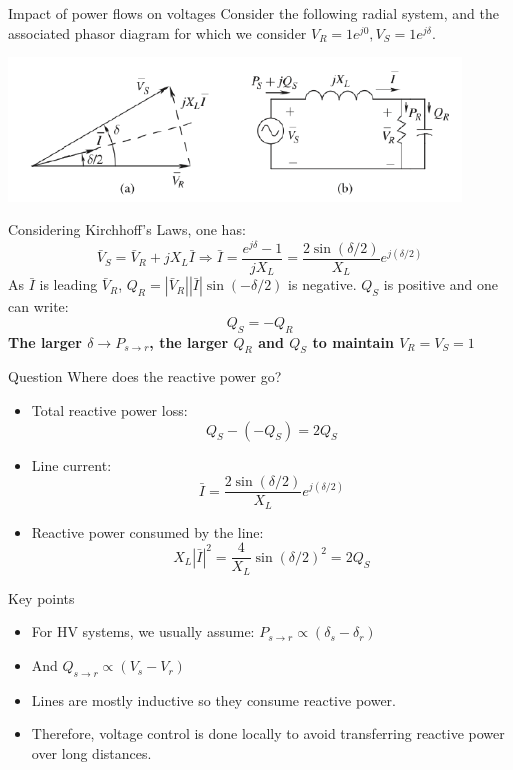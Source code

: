 \begin{frame}[allowframebreaks]{Impact of power flows on voltages}
Consider the following radial system, and the associated phasor diagram for which we consider $V_R = 1 e^{j0}, V_S = 1 e^{j\delta}$.
\begin{center}
\includegraphics[width=0.9\textwidth]{images/RadialSystem2.png}
\end{center}
Considering Kirchhoff's Laws, one has:
$$\bar{V}_S = \bar{V}_R + j X_L \bar{I} \Rightarrow \bar{I} = \frac{e^{j \delta}-1}{j X_L} = \frac{2 \sin(\delta/2)}{X_L} e^{j(\delta/2)}$$
As $\bar{I}$ is leading $\bar{V}_R$, $Q_R = |\bar{V}_R| |\bar{I}| \sin(-\delta/2)$ is negative. $Q_S$ is positive and one can write:
$$Q_S = -Q_R$$
\textbf{The larger $\delta \rightarrow P_{s \rightarrow r}$, the larger $Q_R$ and $Q_S$ to maintain $V_R = V_S = 1$}

\begin{block}{Question}
Where does the reactive power go?
\end{block}

\begin{itemize}
    \item Total reactive power loss:
    $$Q_S-(-Q_S) = 2 Q_S$$
    \item Line current:
    $$\bar{I} = \frac{2 \sin(\delta/2)}{X_L} e^{j(\delta/2)}$$
    \item Reactive power consumed by the line:
    $$X_L |\bar{I}|^2 = \frac{4}{X_L} \sin(\delta/2)^2 = 2 Q_S$$
\end{itemize}
\end{frame}

\begin{frame}{Key points}
\begin{itemize}
    \item For HV systems, we usually assume:
    $P_{s \rightarrow r} \propto (\delta_s - \delta_r)$
    \item And $Q_{s \rightarrow r} \propto (V_s-V_r)$
    \item Lines are mostly inductive so they consume reactive power.
    \item Therefore, voltage control is done locally to avoid transferring reactive power over long distances.
\end{itemize}
\end{frame}

